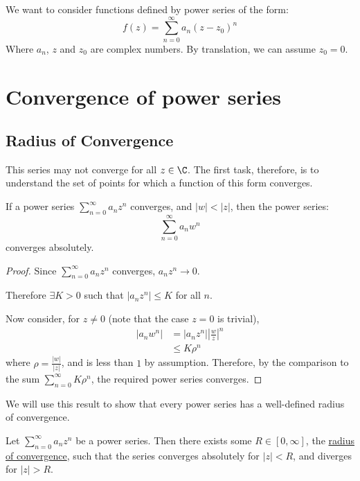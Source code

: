 \documentclass[../Main.tex]{subfiles}
\begin{document}
We want to consider functions defined by power series of the form:
\begin{equation}
    f(z) = \sum_{n=0}^\infty a_n (z - z_0)^n
\end{equation}
Where $a_n$, $z$ and $z_0$ are complex numbers. By translation, we can assume $z_0 = 0$.
\section{Convergence of power series}
\subsection{Radius of Convergence}
This series may not converge for all $z \in \C$. The first task, therefore, is to understand the set of points for which a function of this form converges.
\begin{lemma}
    If a power series $\sum_{n=0}^\infty a_n z^n$ converges, and $|w| < |z|$, then the power series:
    \begin{equation*}
        \sum_{n=0}^\infty a_n w^n
    \end{equation*}
    converges absolutely.
    \label{lemConvergenceRegionIsDisc}
\end{lemma}
\begin{proof}
    Since $\sum_{n=0}^\infty a_n z^n$ converges, $a_n z^n \to 0$.\par
    Therefore $\exists K > 0$ such that $|a_n z^n| \leq K$ for all $n$.\par
    Now consider, for $z \neq 0$ (note that the case $z = 0$ is trivial),
    \begin{align*}
        |a_n w^n| &= |a_n z^n| \left|\frac{w}{z}\right|^n \\
        &\leq K\rho^n
    \end{align*}
    where $\rho = \frac{|w|}{|z|}$, and is less than $1$ by assumption. Therefore, by the comparison to the sum $\sum_{n=0}^\infty K\rho^n$, the required power series converges.
\end{proof}
\begin{remark}
    We will use this result to show that every power series has a well-defined radius of convergence.
\end{remark}
\begin{theorem}
    Let $\sum_{n=0}^\infty a_n z^n$ be a power series. Then there exists some $R \in [0, \infty]$, the \underline{radius of convergence}, such that the series converges absolutely for $|z| < R$, and diverges for $|z| > R$.
    \label{thmRadiusOfConvergence}
\end{theorem}
\end{document}
